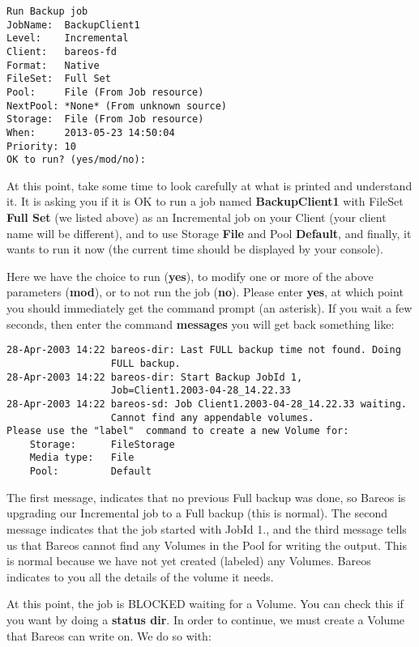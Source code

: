 \footnotesize
\begin{verbatim}
Run Backup job
JobName:  BackupClient1
Level:    Incremental
Client:   bareos-fd
Format:   Native
FileSet:  Full Set
Pool:     File (From Job resource)
NextPool: *None* (From unknown source)
Storage:  File (From Job resource)
When:     2013-05-23 14:50:04
Priority: 10
OK to run? (yes/mod/no):
\end{verbatim}
\normalsize

At this point, take some time to look carefully at what is printed and
understand it. It is asking you if it is OK to run a job named {\bf BackupClient1}
with FileSet {\bf Full Set} (we listed above) as an Incremental job on your
Client (your client name will be different), and to use Storage {\bf File} and
Pool {\bf Default}, and finally, it wants to run it now (the current time
should be displayed by your console).

Here we have the choice to run ({\bf yes}), to modify one or more of the above
parameters ({\bf mod}), or to not run the job ({\bf no}). Please enter {\bf
yes}, at which point you should immediately get the command prompt (an
asterisk). If you wait a few seconds, then enter the command {\bf messages}
you will get back something like:


\footnotesize
\begin{verbatim}
28-Apr-2003 14:22 bareos-dir: Last FULL backup time not found. Doing
                  FULL backup.
28-Apr-2003 14:22 bareos-dir: Start Backup JobId 1,
                  Job=Client1.2003-04-28_14.22.33
28-Apr-2003 14:22 bareos-sd: Job Client1.2003-04-28_14.22.33 waiting.
                  Cannot find any appendable volumes.
Please use the "label"  command to create a new Volume for:
    Storage:      FileStorage
    Media type:   File
    Pool:         Default
\end{verbatim}
\normalsize

The first message, indicates that no previous Full backup was done, so Bareos
is upgrading our Incremental job to a Full backup (this is normal). The second
message indicates that the job started with JobId 1., and the third message
tells us that Bareos cannot find any Volumes in the Pool for writing the
output. This is normal because we have not yet created (labeled) any Volumes.
Bareos indicates to you all the details of the volume it needs.

At this point, the job is BLOCKED waiting for a Volume. You can check this if
you want by doing a {\bf status dir}. In order to continue, we must create a
Volume that Bareos can write on. We do so with:


